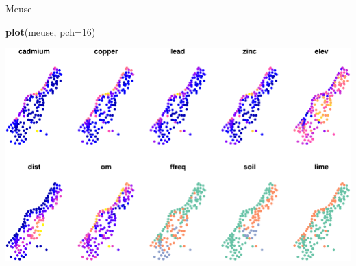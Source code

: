 \documentclass[11pt,ignorenonframetext,]{beamer}
\newenvironment{Shaded}{}{}
\newcommand{\DataTypeTok}[1]{\textcolor[rgb]{0.56,0.13,0.00}{#1}}
\newcommand{\DecValTok}[1]{\textcolor[rgb]{0.25,0.63,0.44}{#1}}
\newcommand{\KeywordTok}[1]{\textcolor[rgb]{0.00,0.44,0.13}{\textbf{#1}}}
\newcommand{\NormalTok}[1]{#1}
\let\oldShaded\Shaded
\let\endoldShaded\endShaded
\renewenvironment{Shaded}{\footnotesize\begin{spacing}{0.9}\oldShaded}{\endoldShaded\end{spacing}}
\let\oldverbatim\verbatim
\let\endoldverbatim\endverbatim
\newcommand{\scriptoutput}{
  \renewenvironment{Shaded}{\scriptsize\begin{spacing}{0.9}\oldShaded}{\endoldShaded\end{spacing}}
  \renewenvironment{verbatim}{\scriptsize\begin{spacing}{0.9}\oldverbatim}{\endoldverbatim\end{spacing}}
}
\begin{document}
\begin{frame}[fragile,t]{Meuse}
\protect\hypertarget{meuse}{}

\scriptoutput

\begin{Shaded}
\begin{Highlighting}[]
\KeywordTok{plot}\NormalTok{(meuse, }\DataTypeTok{pch=}\DecValTok{16}\NormalTok{)}
\end{Highlighting}
\end{Shaded}

\begin{center}\includegraphics[width=\textwidth]{Lec16_files/figure-beamer/unnamed-chunk-10-1} \end{center}

\end{frame}
\end{document}
